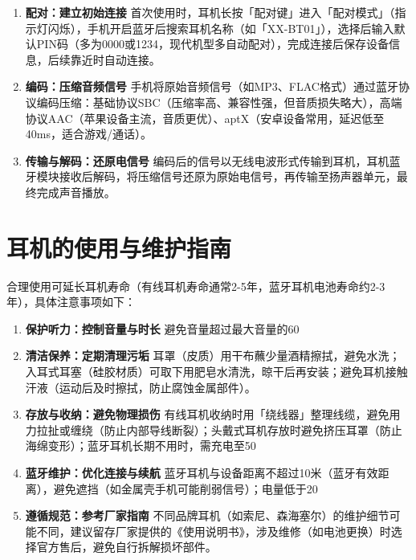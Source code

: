 \documentclass[UTF8]{ctexart}
\begin{document}
\begin{enumerate}[label={\arabic*.}, itemsep=6pt]
    \item \textbf{配对：建立初始连接}  
          首次使用时，耳机长按「配对键」进入「配对模式」（指示灯闪烁），手机开启蓝牙后搜索耳机名称（如「XX-BT01」），选择后输入默认PIN码（多为0000或1234，现代机型多自动配对），完成连接后保存设备信息，后续靠近时自动连接。
    \item \textbf{编码：压缩音频信号}  
          手机将原始音频信号（如MP3、FLAC格式）通过蓝牙协议编码压缩：基础协议SBC（压缩率高、兼容性强，但音质损失略大），高端协议AAC（苹果设备主流，音质更优）、aptX（安卓设备常用，延迟低至40ms，适合游戏/通话）。
    \item \textbf{传输与解码：还原电信号}  
          编码后的信号以无线电波形式传输到耳机，耳机蓝牙模块接收后解码，将压缩信号还原为原始电信号，再传输至扬声器单元，最终完成声音播放。
\end{enumerate}
\clearpage

\section{耳机的使用与维护指南}
合理使用可延长耳机寿命（有线耳机寿命通常2-5年，蓝牙耳机电池寿命约2-3年），具体注意事项如下：

\begin{enumerate}[label={\arabic*.}, itemsep=6pt]
    \item \textbf{保护听力：控制音量与时长}  
          避免音量超过最大音量的60%
    \item \textbf{清洁保养：定期清理污垢}  
          耳罩（皮质）用干布蘸少量酒精擦拭，避免水洗；入耳式耳塞（硅胶材质）可取下用肥皂水清洗，晾干后再安装；避免耳机接触汗液（运动后及时擦拭，防止腐蚀金属部件）。
    \item \textbf{存放与收纳：避免物理损伤}  
          有线耳机收纳时用「绕线器」整理线缆，避免用力拉扯或缠绕（防止内部导线断裂）；头戴式耳机存放时避免挤压耳罩（防止海绵变形）；蓝牙耳机长期不用时，需充电至50%
    \item \textbf{蓝牙维护：优化连接与续航}  
          蓝牙耳机与设备距离不超过10米（蓝牙有效距离），避免遮挡（如金属壳手机可能削弱信号）；电量低于20%
    \item \textbf{遵循规范：参考厂家指南}  
          不同品牌耳机（如索尼、森海塞尔）的维护细节可能不同，建议留存厂家提供的《使用说明书》，涉及维修（如电池更换）时选择官方售后，避免自行拆解损坏部件。
\end{enumerate}
\end{document}
